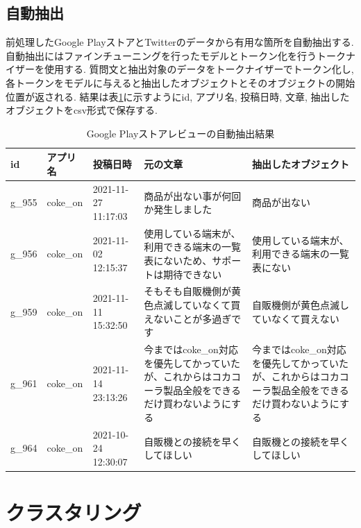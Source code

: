 \subsection{自動抽出}
前処理したGoogle PlayストアとTwitterのデータから有用な箇所を自動抽出する. 自動抽出にはファインチューニングを行ったモデルとトークン化を行うトークナイザーを使用する. 質問文と抽出対象のデータをトークナイザーでトークン化し, 各トークンをモデルに与えると抽出したオブジェクトとそのオブジェクトの開始位置が返される. 
結果は表\ref{tb:googleqa}に示すようにid, アプリ名, 投稿日時, 文章, 抽出したオブジェクトをcsv形式で保存する. 

\begin{table}[H]
  \caption{Google Playストアレビューの自動抽出結果}
  \label{tb:googleqa}
  \small
  \begin{center}
  \begin{tabularx}{\linewidth}{l|l|X|X|X}
    \hline
    id&アプリ名&投稿日時&元の文章&抽出したオブジェクト\\\hline\hline
    g\_955&coke\_on&2021-11-27 11:17:03&商品が出ない事が何回か発生しました&商品が出ない\\\hline
    g\_956&coke\_on&2021-11-02 12:15:37&使用している端末が、利用できる端末の一覧表にないため、サポートは期待できない&使用している端末が、利用できる端末の一覧表にない\\\hline
    g\_959&coke\_on&2021-11-11 15:32:50&そもそも自販機側が黄色点滅していなくて買えないことが多過ぎです&自販機側が黄色点滅していなくて買えない\\\hline
    g\_961&coke\_on&2021-11-14 23:13:26&今まではcoke\_on対応を優先してかっていたが、これからはコカコーラ製品全般をできるだけ買わないようにする&今まではcoke\_on対応を優先してかっていたが、これからはコカコーラ製品全般をできるだけ買わないようにする\\\hline
    g\_964&coke\_on&2021-10-24 12:30:07&自販機との接続を早くしてほしい&自販機との接続を早くしてほしい\\\hline
  \end{tabularx}\end{center}
\end{table}


\section{クラスタリング}\label{clustering}
